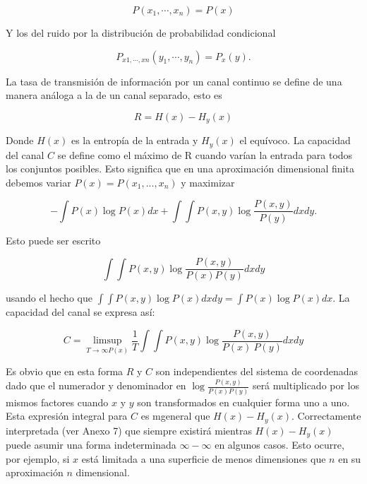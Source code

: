 	\begin{equation}
		P(x_{1}, \cdots ,x_{n}) = P(x)
	\end{equation}	 
	
	Y los del ruido por la distribuci\'on de probabilidad condicional
	
	\begin{equation}
		P_{x1, \cdots ,xn} (y_{1}, \cdots ,y_{n}) = P_{x}(y).
	\end{equation}
	
	La tasa de transmisi\'on de informaci\'on por un canal continuo se define de una
	manera an\'aloga a la de un canal separado, esto es
	
	\begin{equation}
		R = H(x)-H_{y}(x)
	\end{equation}
	
	Donde $H(x)$ es la entrop\'ia de la entrada y $H_{y}(x)$ el equ\'ivoco. La capacidad
	del canal $C$ se define como el m\'aximo de R cuando var\'ian la entrada para todos 
	los conjuntos posibles. Esto significa que en una aproximaci\'on dimensional finita
	debemos variar $P(x) = P(x_{1},...,x_{n})$ y maximizar
	
	\begin{equation}
		- \int P(x) \log P(x)dx + \int\int P(x,y)\log \frac{P(x,y)}{P(y)}dxdy.
   	\end{equation}	 
	
	Esto puede ser escrito
	
	\begin{equation}
		\int\int P(x,y) \log \frac{P(x,y)}{P(x)P(y)}dxdy
	\end{equation}
	
	\bigskip
	usando el hecho que $\int\int P(x,y)\log P(x)dxdy = \int P(x)\log P(x)dx$. La capacidad
	del canal se expresa as\'i:
	
	\begin{equation}
		C = \limsup_{T\to \infty P(x)} \frac{1}{T}\int\int P(x,y)\log \frac{P(x,y)}{P(x)~
		P(y)}dxdy
	\end{equation}
	
	Es obvio que en esta forma $R$ y $C$ son independientes del sistema de coordenadas
	dado que el numerador y denominador en $\log\frac{P(x,y)}{P(x)P(y)}$ ser\'a 
	multiplicado por los mismos factores cuando $x$ y $y$ son transformados en cualquier
	forma uno a uno. Esta expresi\'on integral para $C$ es m general que 
	$H(x)-H_{y}(x)$. Correctamente interpretada (ver Anexo 7) que siempre existir\'a
	mientras $H(x)-H_{y}(x)$ puede asumir una forma indeterminada $\infty - \infty$ en 
	algunos casos. Esto ocurre, por ejemplo, si $x$ est\'a limitada a una superficie
	de menos dimensiones que $n$ en su aproximaci\'on $n$ dimensional.
	
